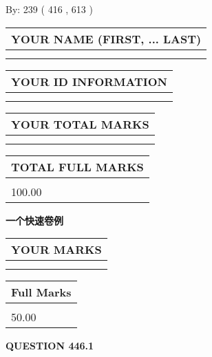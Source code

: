 \documentclass{ctexart}
\begin{document}
   
\hspace{1.0in} By: 
 239 ( 416 ,  613 )
   
   
   
   
\newpage 
\setcounter{page}{ 
   446001 } 
   
   
   
   
\noindent\begin{tabular}{|l|}
\hline
YOUR NAME (FIRST, ... LAST)  \\
\hline
 \\ 
 \\ 
\hline
\end{tabular}
\hspace{0.05in} \begin{tabular}{|l|}
\hline
 YOUR   ID   INFORMATION  \\
\hline
 \\ 
 \\ 
\hline
\end{tabular}
   
   
\vspace{0.2in}\noindent\begin{tabular}{|l|}
\hline
YOUR TOTAL MARKS  \\
\hline
 \\ 
 \\ 
\hline
\end{tabular}
\hspace{0.05in} \begin{tabular}{|l|}
\hline
TOTAL FULL MARKS  \\
\hline
 \\ 
100.00 \\
\hline
\end{tabular}
   
   
 \vspace{0.2in}
{\LARGE {\textbf{ 一个快速卷例}}}
   
   
  
\vspace{0.2in}
  
\noindent\begin{tabular}{|l|}
\hline
 YOUR MARKS  \\
\hline
 \\ 
 \\ 
\hline
\end{tabular}
\hspace{0.05in} \begin{tabular}{|l|}
\hline
 Full Marks  \\
\hline
 \\ 
50.00 \\
\hline
\end{tabular}
{\textbf{\Large{QUESTION
446.1 
}}}
  
\end{document}
